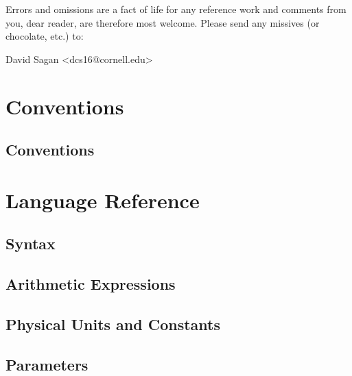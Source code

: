 \documentclass{book}
\begin{document}
Errors and omissions are a fact of life for any reference work and comments from
you, dear reader, are therefore most welcome. Please send any missives 
(or chocolate, etc.) to:
\begin{tty}
  David Sagan <dcs16@cornell.edu>
\end{tty}


\tableofcontents

\listoffigures

\listoftables

\part{Conventions}

\chapter{Conventions}


\part{Language Reference}


\chapter{Syntax}

\chapter{Arithmetic Expressions}

\chapter{Physical Units and Constants}

\chapter{Parameters}
\end{document}
